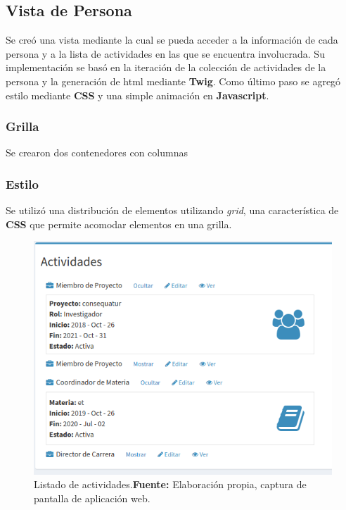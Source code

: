 
\subsection{Vista de Persona}
\label{sub:vista_persona}
Se creó una vista mediante la cual se pueda acceder a la información de cada persona y a la lista de actividades en las que se encuentra involucrada. Su
implementación se basó en la iteración de la colección de actividades  de la persona y la generación de html mediante \textbf{Twig}\@.
Como último paso se agregó estilo mediante \textbf{CSS} y una simple animación en \textbf{Javascript}.

\subsubsection{Grilla}%
\label{ssub:grilla}

Se crearon dos contenedores con columnas 



\subsubsection{Estilo}%
\label{ssub:estilo}

Se utilizó una distribución de elementos utilizando \textit{grid}, una característica de \textbf{CSS} que permite acomodar elementos en una grilla.





\begin{figure}[h]
    \includegraphics[width=1\linewidth]{image/vista_persona.png}
    \caption{Listado de actividades.\newline \textbf{Fuente:} Elaboración propia, captura de pantalla de aplicación web.}
    \label{fig:image/vista_persona}
\end{figure}


